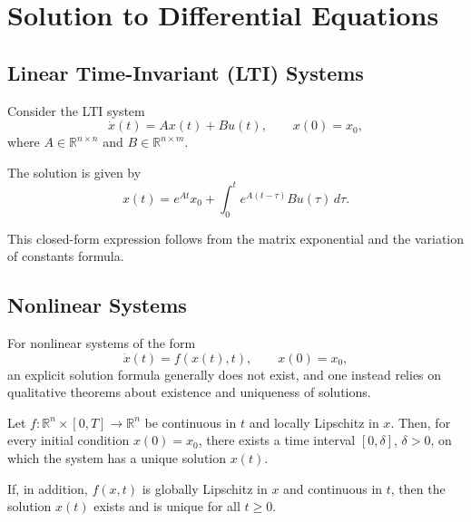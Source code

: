\section{Solution to Differential Equations}

\subsection{Linear Time-Invariant (LTI) Systems}

Consider the LTI system
\[
    \dot{x}(t) = A x(t) + B u(t), \qquad x(0) = x_0,
\]
where $A \in \mathbb{R}^{n \times n}$ and $B \in \mathbb{R}^{n \times m}$.

The solution is given by
\[
    x(t) = e^{At} x_0 + \int_0^t e^{A(t-\tau)} B u(\tau)\, d\tau.
\]

This closed-form expression follows from the matrix exponential and the variation of constants formula.


\subsection{Nonlinear Systems}

For nonlinear systems of the form
\[
    \dot{x}(t) = f(x(t),t), \qquad x(0) = x_0,
\]
an explicit solution formula generally does not exist, and one instead relies on qualitative theorems about existence and uniqueness of solutions.


\begin{theorem}
    Let $f:\mathbb{R}^n \times [0,T] \to \mathbb{R}^n$ be continuous in $t$ and locally Lipschitz in $x$.  
    Then, for every initial condition $x(0)=x_0$, there exists a time interval $[0,\delta]$, $\delta > 0$, on which the system has a unique solution $x(t)$.
\end{theorem}


\begin{theorem}
    If, in addition, $f(x,t)$ is globally Lipschitz in $x$ and continuous in $t$, then the solution $x(t)$ exists and is unique for all $t \geq 0$.
\end{theorem}
